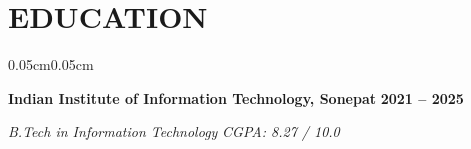 \documentclass[10pt, letterpaper]{article}
\newenvironment{onecolentry}{
\begin{adjustwidth}{0.05cm}{0.05cm}
}{
\end{adjustwidth}
}
\begin{document}
\vspace{0.15cm}


\section{EDUCATION}

\begin{onecolentry}

\textbf{Indian Institute of Information Technology, Sonepat}
\hfill
\textbf{2021 -- 2025}

\textit{B.Tech in Information Technology}
\hfill
\textit{CGPA: 8.27 / 10.0}

\end{onecolentry}
\end{document}
